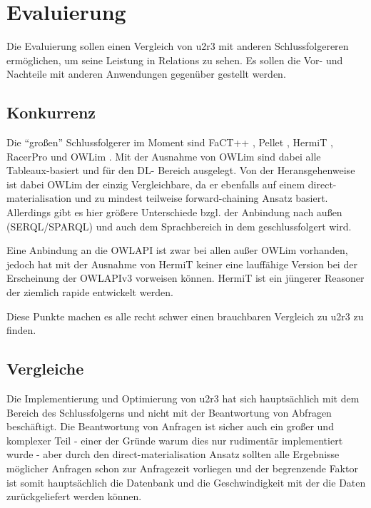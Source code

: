 \chapter{Evaluierung}
Die Evaluierung sollen einen Vergleich von u2r3 mit anderen Schlussfolgereren ermöglichen, um seine Leistung in Relations zu sehen. Es sollen die Vor- und Nachteile mit anderen Anwendungen gegenüber gestellt werden.

\section{Konkurrenz}
Die ``großen'' Schlussfolgerer im Moment sind FaCT++ \cite{Factpp}, Pellet \cite{Pellet}, HermiT \cite{Hermit}, RacerPro \cite{RacerPro} und OWLim \cite{OWLim}. Mit der Ausnahme von OWLim sind dabei alle Tableaux-basiert und für den DL- Bereich ausgelegt. Von der Heransgehenweise ist dabei OWLim der einzig Vergleichbare, da er ebenfalls auf einem direct-materialisation und zu mindest teilweise forward-chaining Ansatz basiert. Allerdings gibt es hier größere Unterschiede bzgl. der Anbindung nach außen (SERQL/SPARQL) und auch dem Sprachbereich in dem geschlussfolgert wird.

Eine Anbindung an die OWLAPI ist zwar bei allen außer OWLim vorhanden, jedoch hat mit der Ausnahme von HermiT keiner eine lauffähige Version bei der Erscheinung der OWLAPIv3 vorweisen können. HermiT ist ein jüngerer Reasoner der ziemlich rapide entwickelt werden.

Diese Punkte machen es alle recht schwer einen brauchbaren Vergleich zu u2r3 zu finden.

\section{Vergleiche}
Die Implementierung und Optimierung von u2r3 hat sich hauptsächlich mit dem Bereich des Schlussfolgerns und nicht mit der Beantwortung von Abfragen beschäftigt. Die Beantwortung von Anfragen ist sicher auch ein großer und komplexer Teil - einer der Gründe warum dies nur rudimentär implementiert wurde - aber durch den direct-materialisation Ansatz sollten alle Ergebnisse möglicher Anfragen schon zur Anfragezeit vorliegen und der begrenzende Faktor ist somit hauptsächlich die Datenbank und die Geschwindigkeit mit der die Daten zurückgeliefert werden können.


